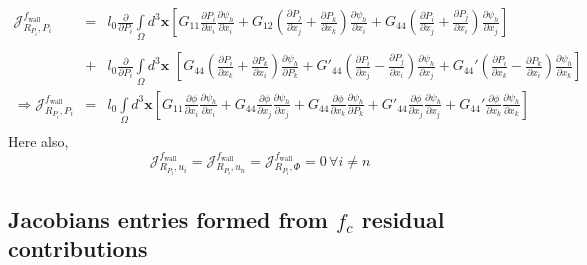 \documentclass[16pt]{article} %
\begin{document}
\begin{eqnarray}\nonumber
\mathscr{J}_{R_{P_i},P_i}^{f_\mathrm{wall}} &=&l_0 \frac{\partial}{\partial P_i} \int\limits_\Omega d^3 {\boldsymbol x} \left[G_{11} \frac{\partial P_i}{\partial x_i} \frac{\partial \psi_h}{\partial x_i} + G_{12} \left(\frac{\partial P_j}{\partial x_j} + \frac{\partial P_k}{\partial x_k} \right) \frac{\partial \psi_h}{\partial x_i} + G_{44} \left(\frac{\partial P_i}{\partial x_j} + \frac{\partial P_j}{\partial x_i} \right)\frac{\partial \psi_h}{\partial x_j} \right]\\ \nonumber\\ \nonumber
&+&l_0 \frac{\partial}{\partial P_i} \int\limits_\Omega d^3 {\boldsymbol x} \,\,\left[ G_{44} \left(\frac{\partial P_i}{\partial x_k} + \frac{\partial P_k}{\partial x_i} \right) \frac{\partial \psi_h}{\partial P_k} + G'_{44} \left(\frac{\partial P_i}{\partial x_j}  - \frac{\partial P_j}{\partial x_i}\right) \frac{\partial \psi_h}{\partial x_j} + G_{44}' \left(\frac{\partial P_i}{\partial x_k} - \frac{\partial P_k}{\partial x_i} \right) \frac{\partial \psi_h}{\partial x_k}\right]\\ \nonumber
 \Rightarrow \mathscr{J}_{R_{P_i},P_i}^{f_\mathrm{wall}} &=& l_0 \int\limits_\Omega d^3 {\boldsymbol x} \left[G_{11} \frac{\partial \phi}{\partial x_i} \frac{\partial \psi_h}{\partial x_i}  + G_{44} \frac{\partial \phi}{\partial x_j} \frac{\partial \psi_h}{\partial x_j}  +  G_{44} \frac{\partial \phi}{\partial x_k}  \frac{\partial \psi_h}{\partial P_k} + G'_{44} \frac{\partial \phi}{\partial x_j} \frac{\partial \psi_h}{\partial x_j} + G_{44}' \frac{\partial \phi}{\partial x_k}  \frac{\partial \psi_h}{\partial x_k}\right]\\ \nonumber
\end{eqnarray}
Here also, 
$$\mathscr{J}_{R_{P_i} , u_i}^{f_\mathrm{wall}} = \mathscr{J}_{R_{P_i} , u_n}^{f_\mathrm{wall}} = \mathscr{J}_{R_{P_i} , \Phi}^{f_\mathrm{wall}} = 0 \,\forall i \neq n $$

\newpage
\subsection{Jacobians entries formed from $f_c$ residual contributions}
\end{document}
